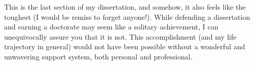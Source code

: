 



This is the last section of my dissertation, and somehow, it also feels like the toughest (I would be remiss to forget anyone!). While defending a dissertation and earning a doctorate may seem like a solitary achievement, I can unequivocally assure you that it is not. This accomplishment (and my life trajectory in general) would not have been possible without a wonderful and unwavering support system, both personal and professional.

